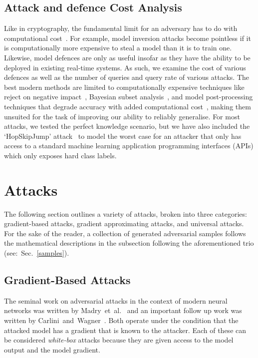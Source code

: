 \subsection{Attack and defence Cost Analysis}

Like in cryptography, the fundamental limit for an adversary has to do with computational cost~\cite{hoffstein_pipher_silverman_2010}.
For example, model inversion attacks become pointless if it is computationally more expensive to steal a model than it is to train one.
Likewise, model defences are only as useful insofar as they have the ability to be deployed in existing real-time systems.
As such, we examine the cost of various defences as well as the number of queries and query rate of various attacks.
The best modern methods are limited to computationally expensive techniques like reject on negative impact~\cite{nelson2010behavior}, Bayesian subset analysis~\cite{bect_bayesian_2017}, and model post-processing techniques that degrade accuracy with added computational cost~\cite{athalye_obfuscated_2018,papernot,li_general_2016}, making them unsuited for the task of improving our ability to reliably generalise.
For most attacks, we tested the perfect knowledge scenario, but we have also included the `HopSkipJump' attack~\cite{hopskipjump} to model the worst case for an attacker that only has access to a standard machine learning application programming interfaces (APIs) which only exposes hard class labels.


\section{Attacks}
\label{attacks}

The following section outlines a variety of attacks, broken into three categories: gradient-based attacks, gradient approximating attacks, and universal attacks.
For the sake of the reader, a collection of generated adversarial samples follows the mathematical descriptions in the subsection following the aforementioned trio (see:~Sec.~\ref{samples}).

\subsection{Gradient-Based Attacks}

The seminal work on adversarial attacks in the context of modern neural networks was written by Madry~et~al.~\cite{madry2017towards} and an important follow up work was written by Carlini~and~Wagner~\cite{carlini_towards_2017}.
Both operate under the condition that the attacked model has a gradient that is known to the attacker.
Each of these can be considered \textit{white-box} attacks because they are given access to the model output and the model gradient.


